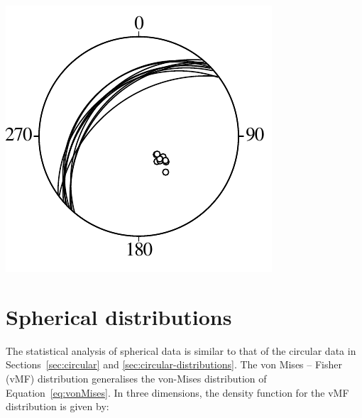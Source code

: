 \begin{enumerate}
\noindent\begin{minipage}[t][][b]{.3\linewidth}
\includegraphics[width=\textwidth]{../figures/fault.pdf}\\
\end{minipage}
\begin{minipage}[t][][t]{.7\linewidth}
  \label{fig:fault}
\end{minipage}

\end{enumerate}

\section{Spherical distributions}
\label{sec:spherical-distributions}

The statistical analysis of spherical data is similar to that of the
circular data in Sections~\ref{sec:circular} and
\ref{sec:circular-distributions}. The von Mises -- Fisher (vMF)
distribution generalises the von-Mises distribution of
Equation~\ref{eq:vonMises}.  In three dimensions, the density function
for the vMF distribution is given by:

